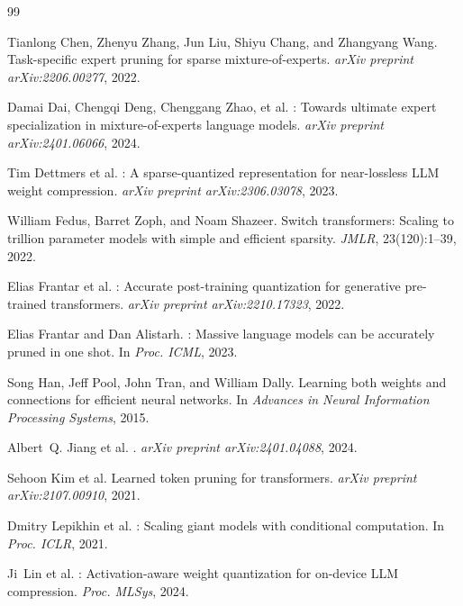 \documentclass[final]{article}
\begin{document}

\begin{thebibliography}{99}

Tianlong Chen, Zhenyu Zhang, Jun Liu, Shiyu Chang, and Zhangyang Wang.
\newblock Task-specific expert pruning for sparse mixture-of-experts.
\newblock \emph{arXiv preprint arXiv:2206.00277}, 2022.

Damai Dai, Chengqi Deng, Chenggang Zhao, et al.
: Towards ultimate expert specialization in
  mixture-of-experts language models.
\newblock \emph{arXiv preprint arXiv:2401.06066}, 2024.

Tim Dettmers et al.
: A sparse-quantized representation for near-lossless {LLM}
  weight compression.
\newblock \emph{arXiv preprint arXiv:2306.03078}, 2023.

William Fedus, Barret Zoph, and Noam Shazeer.
\newblock Switch transformers: Scaling to trillion parameter models with simple
  and efficient sparsity.
\newblock \emph{JMLR}, 23(120):1--39, 2022.

Elias Frantar et al.
: Accurate post-training quantization for generative
  pre-trained transformers.
\newblock \emph{arXiv preprint arXiv:2210.17323}, 2022.

Elias Frantar and Dan Alistarh.
: Massive language models can be accurately pruned in
  one shot.
\newblock In \emph{Proc. ICML}, 2023.

Song Han, Jeff Pool, John Tran, and William Dally.
\newblock Learning both weights and connections for efficient neural networks.
\newblock In \emph{Advances in Neural Information Processing Systems}, 2015.

Albert~Q. Jiang et al.
.
\newblock \emph{arXiv preprint arXiv:2401.04088}, 2024.

Sehoon Kim et al.
\newblock Learned token pruning for transformers.
\newblock \emph{arXiv preprint arXiv:2107.00910}, 2021.

Dmitry Lepikhin et al.
: Scaling giant models with conditional computation.
\newblock In \emph{Proc. ICLR}, 2021.

Ji~Lin et al.
: Activation-aware weight quantization for on-device {LLM}
  compression.
\newblock \emph{Proc. MLSys}, 2024.


\end{thebibliography}
\end{document}
